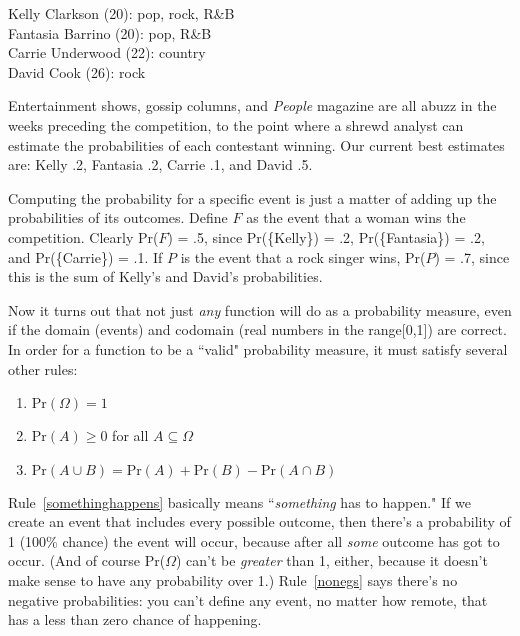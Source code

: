 \begin{minipage}{\textwidth}
\begin{center}
Kelly Clarkson (20): pop, rock, R\&B \\
Fantasia Barrino (20): pop, R\&B \\
Carrie Underwood (22): country \\
David Cook (26): rock
\end{center}
\end{minipage}

Entertainment shows, gossip columns, and \textit{People} magazine are all
abuzz in the weeks preceding the competition, to the point where a shrewd
analyst can estimate the probabilities of each contestant winning. Our
current best estimates are: Kelly .2, Fantasia .2, Carrie .1, and David .5.

Computing the probability for a specific event is just a matter of adding
up the probabilities of its outcomes. Define $F$ as the event that a woman
wins the competition. Clearly Pr($F$) = .5, since Pr(\{Kelly\}) = .2,
Pr(\{Fantasia\}) = .2, and Pr(\{Carrie\}) = .1. If $P$ is the event that a
rock singer wins, Pr($P$) = .7, since this is the sum of Kelly's and
David's probabilities.

Now it turns out that not just \textit{any} function will do as a
probability measure, even if the domain (events) and codomain (real numbers
in the range[0,1]) are correct. In order for a function to be a ``valid"
probability measure, it must satisfy several other rules:
\begin{enumerate}
\item \label{somethinghappens} $\text{Pr}(\Omega) = 1$
\item \label{nonegs} $\text{Pr}(A) \geq 0$ for all $A \subseteq \Omega$
\item \label{probunion} $\text{Pr}(A \cup B) = \text{Pr}(A) + \text{Pr}(B) -
    \text{Pr}(A \cap B)$
\end{enumerate}

Rule~\ref{somethinghappens} basically means ``\textit{something} has to
happen." If we create an event that includes every possible outcome, then
there's a probability of 1 (100\% chance) the event will occur, because
after all \textit{some} outcome has got to occur. (And of course
Pr($\Omega$) can't be \textit{greater} than 1, either, because it doesn't
make sense to have any probability over 1.) Rule~\ref{nonegs} says there's
no negative probabilities: you can't define any event, no matter how
remote, that has a less than zero chance of happening.

